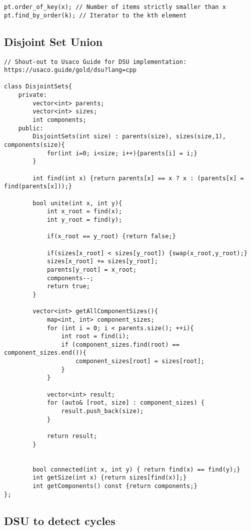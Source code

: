 \documentclass[10pt]{article}
\begin{document}
\begin{multicols*}{2}
\begin{lstlisting}[style=compactcpp]
pt.order_of_key(x); // Number of items strictly smaller than x
pt.find_by_order(k); // Iterator to the kth element

\end{lstlisting}

\subsection{Disjoint Set Union}

\begin{lstlisting}[style=compactcpp]
// Shout-out to Usaco Guide for DSU implementation: https://usaco.guide/gold/dsu?lang=cpp
 
class DisjointSets{
    private:
        vector<int> parents;
        vector<int> sizes;
        int components;
    public:
        DisjointSets(int size) : parents(size), sizes(size,1), components(size){
            for(int i=0; i<size; i++){parents[i] = i;}
        }

        int find(int x) {return parents[x] == x ? x : (parents[x] = find(parents[x]));}

        bool unite(int x, int y){
            int x_root = find(x);
            int y_root = find(y);

            if(x_root == y_root) {return false;}

            if(sizes[x_root] < sizes[y_root]) {swap(x_root,y_root);}
            sizes[x_root] += sizes[y_root];
            parents[y_root] = x_root;
            components--;
            return true;
        }

        vector<int> getAllComponentSizes(){
            map<int, int> component_sizes;
            for (int i = 0; i < parents.size(); ++i){
                int root = find(i);
                if (component_sizes.find(root) == component_sizes.end()){
                    component_sizes[root] = sizes[root];
                }
            }

            vector<int> result;
            for (auto& [root, size] : component_sizes) {
                result.push_back(size);
            }

            return result;
        }


        bool connected(int x, int y) { return find(x) == find(y);}
        int getSize(int x) {return sizes[find(x)];}
        int getComponents() const {return components;}
};
\end{lstlisting}

\subsection{DSU to detect cycles}


\end{multicols*}
\end{document}
